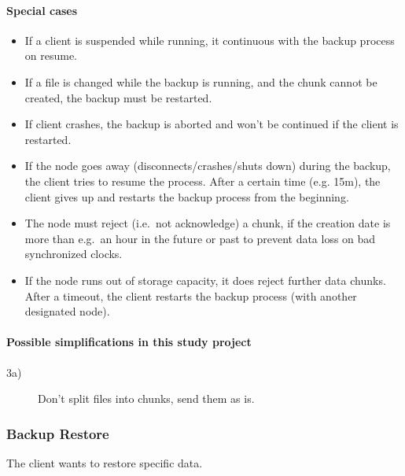 \paragraph{Special cases}
\begin{itemize}
    \item If a client is suspended while running, it continuous with the backup process on resume. %
    \item If a file is changed while the backup is running, and the chunk cannot be created, the backup must be restarted. %
    \item If client crashes, the backup is aborted and won't be continued if the client is restarted.
    \item If the node goes away (disconnects/crashes/shuts down) during the backup, the client tries to resume the process. After a certain time (e.g. 15m), the client gives up and restarts the backup process from the beginning.
    \item The node must reject (i.e.\ not acknowledge) a chunk, if the creation date is more than e.g.\ an hour in the future or past to prevent data loss on bad synchronized clocks.
    \item If the node runs out of storage capacity, it does reject further data chunks. After a timeout, the client restarts the backup process (with another designated node).
\end{itemize}

\paragraph{Possible simplifications in this study project}
\begin{description}
    \item[3a)] Don't split files into chunks, send them as is.
\end{description}

\subsubsection{Backup Restore}\label{sec:scenario-backup-restore}
The client wants to restore specific data.

